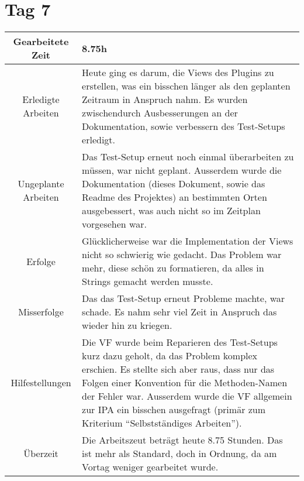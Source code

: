 \section{Tag 7}
\begin{tabularx}{\textwidth}[H]{|c|X|}
  \hline
  Gearbeitete Zeit & 8.75h \\ \hline
  Erledigte Arbeiten & Heute ging es darum, die Views des Plugins zu erstellen, was ein bisschen länger als den geplanten
  Zeitraum in Anspruch nahm. Es wurden zwischendurch Ausbesserungen an der Dokumentation, sowie verbessern des Test-Setups
  erledigt. \\ \hline
  Ungeplante Arbeiten & Das Test-Setup erneut noch einmal überarbeiten zu müssen, war nicht geplant. Ausserdem wurde die
  Dokumentation (dieses Dokument, sowie das Readme des Projektes) an bestimmten Orten ausgebessert, was auch nicht so im
  Zeitplan vorgesehen war. \\ \hline
  Erfolge & Glücklicherweise war die Implementation der Views nicht so schwierig wie gedacht. Das Problem war mehr, diese
  schön zu formatieren, da alles in Strings gemacht werden musste. \\ \hline
  Misserfolge & Das das Test-Setup erneut Probleme machte, war schade. Es nahm sehr viel Zeit in Anspruch das wieder hin zu
  kriegen. \\ \hline
  Hilfestellungen & Die VF wurde beim Reparieren des Test-Setups kurz dazu geholt, da das Problem komplex erschien.
  Es stellte sich aber raus, dass nur das Folgen einer Konvention für die Methoden-Namen der Fehler war. \newline
  Ausserdem wurde die VF allgemein zur IPA ein bisschen ausgefragt (primär zum Kriterium
  \enquote{Selbstständiges Arbeiten}). \\ \hline
  Überzeit & Die Arbeitszeut beträgt heute 8.75 Stunden. Das ist mehr als Standard, doch in Ordnung, da am Vortag weniger
  gearbeitet wurde. \\ \hline
\end{tabularx}

\newpage

